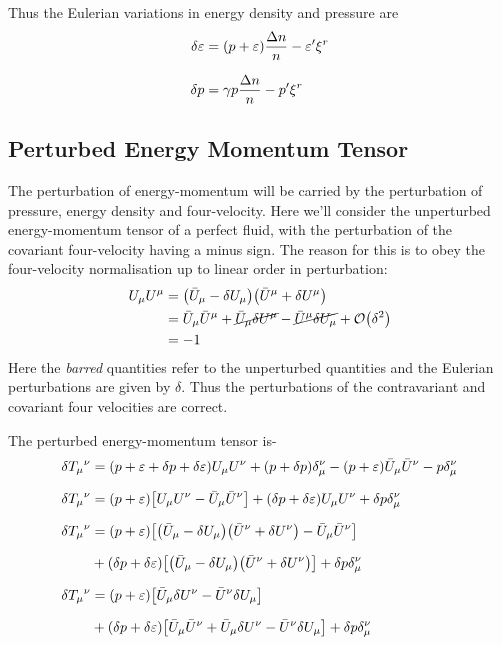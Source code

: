 \documentclass[a4paper,12pt,onehalfspacing]{report}
\begin{document}
Thus the Eulerian variations in energy density and pressure are
\begin{align}
    \delta \varepsilon&= \qty(p+\varepsilon)\frac{\Delta n}{n} - \varepsilon'\xi^r\label{eq: pert e}\\[1.5ex]
    \delta p&= \gamma p\frac{\Delta n}{n} - p'\xi^r \label{eq: pert p}
\end{align}

\subsection{Perturbed Energy Momentum Tensor}

The perturbation of energy-momentum will be carried by the perturbation of pressure, energy density and four-velocity. Here we'll consider the unperturbed energy-momentum tensor of a perfect fluid, with the perturbation of the covariant four-velocity having a minus sign. The reason for this is to obey the four-velocity normalisation up to linear order in perturbation:
\begin{align*}
    U_\mu U^\mu &= \qty(\bar{U}_\mu- \delta U_\mu)\qty(\bar{U}^\mu+ \delta U^\mu)\\
    &= \bar{U}_\mu \bar{U}^\mu+ \cancel{\bar{U}_\mu \delta{U}^\mu}- \cancel{\bar{U}^\mu\delta{U}_\mu}+\mathcal{O} \qty(\delta^2)\\
    &= -1
\end{align*}
Here the \emph{barred} quantities refer to the unperturbed quantities and the Eulerian perturbations are given by $\delta$. Thus the perturbations of the contravariant and covariant four velocities are correct. 

The perturbed energy-momentum tensor is- 
\begin{align}
    \delta T_\mu{}^\nu &= \qty(p+\varepsilon+ \delta p+\delta\varepsilon)U_\mu U^\nu + \qty(p+\delta p)\delta_\mu^\nu - \qty(p+\varepsilon)\bar{U}_\mu \bar{U}^\nu - p\delta_\mu^\nu \nonumber\\[1.5ex]
    \delta T_\mu{}^\nu &= \qty(p+\varepsilon)\qty[U_\mu U^\nu- \bar{U}_\mu \bar{U}^\nu]+\qty(\delta p+\delta\varepsilon)U_\mu U^\nu + \delta p\delta_\mu^\nu \label{eq: pert T 1}\\[1.5ex]
    \delta T_\mu{}^\nu &= \qty(p+\varepsilon)\qty[\qty(\bar{U}_\mu-\delta U_\mu)\qty(\bar{U}^\nu+ \delta U^\nu)- \bar{U}_\mu \bar{U}^\nu] \nonumber\\[1.5ex]
    &+\qty(\delta p+\delta\varepsilon)\qty[\qty(\bar{U}_\mu-\delta U_\mu)\qty(\bar{U}^\nu+ \delta U^\nu)] + \delta p\delta_\mu^\nu \nonumber\\[1.5ex]
    \delta T_\mu{}^\nu &= \qty(p+\varepsilon)\qty[\bar{U}_\mu \delta U^\nu-\bar{U}^\nu \delta U_\mu] \nonumber\\[1.5ex]
    &+\qty(\delta p+\delta\varepsilon)\qty[\bar{U}_\mu \bar{U}^\nu+\bar{U}_\mu \delta U^\nu-\bar{U}^\nu \delta U_\mu] + \delta p\delta_\mu^\nu \label{eq: pert T 2}
\end{align}
\end{document}
